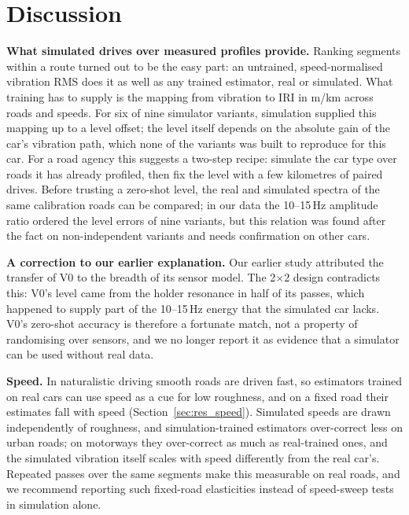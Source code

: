 \section{Discussion}
\label{sec:discussion}

\textbf{What simulated drives over measured profiles provide.}
Ranking segments within a route turned out to be the easy part: an untrained, speed-normalised vibration RMS does it as well as any trained estimator, real or simulated.
What training has to supply is the mapping from vibration to IRI in m/km across roads and speeds.
For six of nine simulator variants, simulation supplied this mapping up to a level offset; the level itself depends on the absolute gain of the car's vibration path, which none of the variants was built to reproduce for this car.
For a road agency this suggests a two-step recipe: simulate the car type over roads it has already profiled, then fix the level with a few kilometres of paired drives.
Before trusting a zero-shot level, the real and simulated spectra of the same calibration roads can be compared; in our data the 10--15\,Hz amplitude ratio ordered the level errors of nine variants, but this relation was found after the fact on non-independent variants and needs confirmation on other cars.

\textbf{A correction to our earlier explanation.}
Our earlier study attributed the transfer of V0 to the breadth of its sensor model.
The 2$\times$2 design contradicts this: V0's level came from the holder resonance in half of its passes, which happened to supply part of the 10--15\,Hz energy that the simulated car lacks.
V0's zero-shot accuracy is therefore a fortunate match, not a property of randomising over sensors, and we no longer report it as evidence that a simulator can be used without real data.

\textbf{Speed.}
In naturalistic driving smooth roads are driven fast, so estimators trained on real cars can use speed as a cue for low roughness, and on a fixed road their estimates fall with speed (Section~\ref{sec:res_speed}).
Simulated speeds are drawn independently of roughness, and simulation-trained estimators over-correct less on urban roads; on motorways they over-correct as much as real-trained ones, and the simulated vibration itself scales with speed differently from the real car's.
Repeated passes over the same segments make this measurable on real roads, and we recommend reporting such fixed-road elasticities instead of speed-sweep tests in simulation alone.

